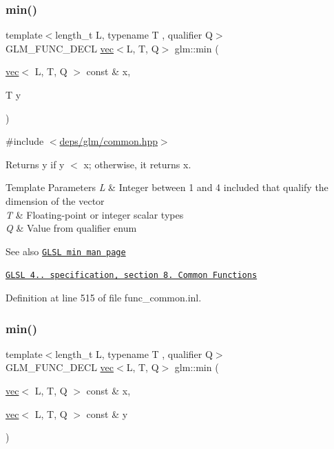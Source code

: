 \subsubsection{\texorpdfstring{min()}{min()}\hspace{0.1cm}{\footnotesize\ttfamily [2/3]}}
{\footnotesize\ttfamily template$<$length\+\_\+t L, typename T , qualifier Q$>$ \\
G\+L\+M\+\_\+\+F\+U\+N\+C\+\_\+\+D\+E\+CL \hyperlink{structglm_1_1vec}{vec}$<$L, T, Q$>$ glm\+::min (\begin{DoxyParamCaption}\item[{\hyperlink{structglm_1_1vec}{vec}$<$ L, T, Q $>$ const \&}]{x,  }\item[{T}]{y }\end{DoxyParamCaption})}



{\ttfamily \#include $<$\hyperlink{common_8hpp}{deps/glm/common.\+hpp}$>$}

Returns y if y $<$ x; otherwise, it returns x.


\begin{DoxyTemplParams}{Template Parameters}
{\em L} & Integer between 1 and 4 included that qualify the dimension of the vector \\
\hline
{\em T} & Floating-\/point or integer scalar types \\
\hline
{\em Q} & Value from qualifier enum\\
\hline
\end{DoxyTemplParams}
\begin{DoxySeeAlso}{See also}
\href{http://www.opengl.org/sdk/docs/manglsl/xhtml/min.xml}{\tt G\+L\+SL min man page} 

\href{http://www.opengl.org/registry/doc/GLSLangSpec.4.20.8.pdf}{\tt G\+L\+SL 4.. specification, section 8. Common Functions} 
\end{DoxySeeAlso}


Definition at line 515 of file func\+\_\+common.\+inl.

\mbox{\label{group__core__func__common_ga734a374ca5c808e7bd9f74b6acfd7478}} 
\subsubsection{\texorpdfstring{min()}{min()}\hspace{0.1cm}{\footnotesize\ttfamily [3/3]}}
{\footnotesize\ttfamily template$<$length\+\_\+t L, typename T , qualifier Q$>$ \\
G\+L\+M\+\_\+\+F\+U\+N\+C\+\_\+\+D\+E\+CL \hyperlink{structglm_1_1vec}{vec}$<$L, T, Q$>$ glm\+::min (\begin{DoxyParamCaption}\item[{\hyperlink{structglm_1_1vec}{vec}$<$ L, T, Q $>$ const \&}]{x,  }\item[{\hyperlink{structglm_1_1vec}{vec}$<$ L, T, Q $>$ const \&}]{y }\end{DoxyParamCaption})}



